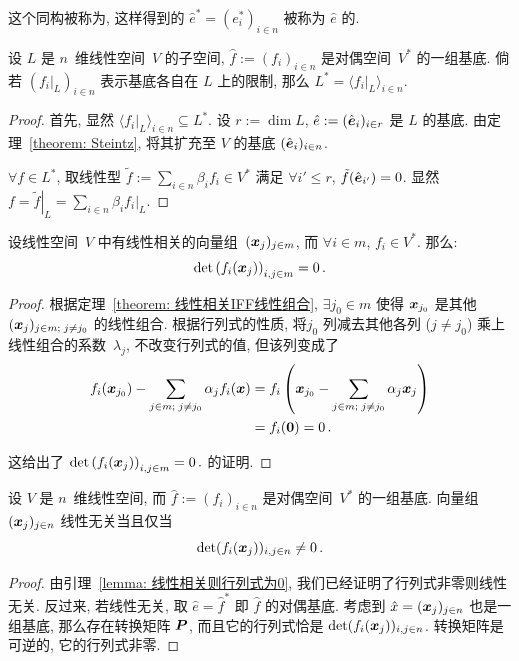 \documentclass[openany, a5paper, oneside]{ctexbook}
\begin{document}
这个同构被称为, 这样得到的 $\hat e^* = (e^*_i)_{i \in n}$ 被称为 $\hat e$ 的.

\begin{lemma}\label{lemma: 子空间的对偶}
	设 $L$ 是 $n$~维线性空间~$V$ 的子空间, $\hat f := (f_i)_{i \in n}$ 是对偶空间~$V^*$ 的一组基底. 
	倘若 $(\left. f_i \right|_L)_{i \in n}$ 表示基底各自在 $L$ 上的限制,
	那么 $L^* = \langle \left. f_i \right|_L \rangle_{i \in n}$.
\end{lemma}
\begin{proof}
	首先, 显然 $\langle \left. f_i \right|_L \rangle_{i \in n} \subseteq L^*$.
	设 $r := \dim L$, $\hat e := (\hat{\boldsymbol{e}}_i)_{i \in r}$ 是 $L$ 的基底. 
	由定理~\ref{theorem: Steintz}, 将其扩充至 $V$ 的基底 $(\hat{\boldsymbol{e}}_i)_{i \in n}$.

	$\forall f \in L^*$, 取线性型 $\tilde f := \sum_{i \in n} \beta_i f_i \in V^*$ 满足 $\forall i' \leq r$, $\tilde f(\hat{\boldsymbol{e}}_{i'}) = 0$. 
	显然 $f = \left. \tilde f \right|_L = \sum_{i \in n} \beta_i \left. f_i \right|_L$.
\end{proof}


\begin{lemma}\label{lemma: 线性相关则行列式为0}
	设线性空间~$V$ 中有线性相关的向量组~$(\boldsymbol{x}_j)_{j\in m}$, 而 $\forall i \in m$, $f_i \in V^*$. 那么:
	\begin{equation*}
		\det\left( 
			f_i (\boldsymbol{x}_j)
		 \right)_{i,j \in m} = 0\,.
	\end{equation*}
\end{lemma}
\begin{proof}
	根据定理~\ref{theorem: 线性相关IFF线性组合}, $\exists j_0 \in m$ 使得 $\boldsymbol{x}_{j_0}$ 是其他 $(\boldsymbol{x}_j)_{j\in m;\; j \neq j_0}$ 的线性组合. 
	根据行列式的性质, 将$j_0$ 列减去其他各列 ($j \neq j_0$) 乘上线性组合的系数~$\lambda_j$, 不改变行列式的值, 但该列变成了
	\begin{align*}
		f_i(\boldsymbol{x}_{j_0}) 
			- \sum_{j \in m;\; j \neq j_0} \alpha_j f_i(\boldsymbol{x})
			&= f_i\left(\boldsymbol{x}_{j_0} 
					- \sum_{j \in m;\; j \neq j_0} \alpha_j \boldsymbol{x}_j
				\right)
			\\
			&= f_i(\boldsymbol{0})
			= 0\,.
	\end{align*}
	
	这给出了 $
		\det\left( 
			f_i (\boldsymbol{x}_j)
		 \right)_{i,j \in m} = 0\,.
	$ 的证明.
\end{proof}

\begin{lemma}\label{lemma: 线性无关IFF行列式非零}
	设 $V$ 是 $n$~维线性空间, 而 $\hat f := (f_i)_{i \in n}$ 是对偶空间~$V^*$ 的一组基底.
	向量组~$(\boldsymbol{x}_j)_{j \in n}$ 线性无关当且仅当
	\begin{equation*}
		\det(f_i(\boldsymbol{x}_j))_{i,j \in n} \neq 0\,.
	\end{equation*}
\end{lemma}
\begin{proof}
	由引理~\ref{lemma: 线性相关则行列式为0}, 我们已经证明了行列式非零则线性无关. 
	反过来, 若线性无关, 取 $\hat e = \hat f^*$ 即 $\hat f$ 的对偶基底. 
	考虑到 $\hat x = (\boldsymbol{x}_j)_{j \in n}$ 也是一组基底, 那么存在转换矩阵 $\boldsymbol{P}$, 而且它的行列式恰是 $\det(f_i(\boldsymbol{x}_j))_{i,j \in n}$. 
	转换矩阵是可逆的, 它的行列式非零.
\end{proof}
\end{document}
